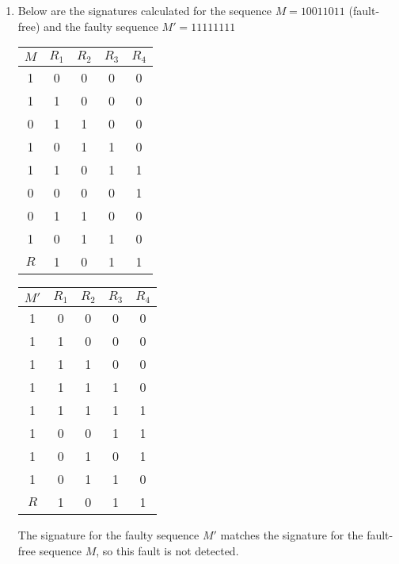 \documentclass[a4paper,12pt]{article}
\begin{document}
\begin{enumerate}
        \item Below are the signatures calculated for the sequence $M = {10011011}$ (fault-free) and the faulty sequence $M' = {11111111}$

            \begin{tabular}{|c|c|c|c|c|}
                \hline
                $M$ & $R_1$ & $R_2$ & $R_3$ & $R_4$ \\ \hline
                1   & 0     & 0     & 0     & 0     \\ \hline
                1   & 1     & 0     & 0     & 0     \\ \hline
                0   & 1     & 1     & 0     & 0     \\ \hline
                1   & 0     & 1     & 1     & 0     \\ \hline
                1   & 1     & 0     & 1     & 1     \\ \hline
                0   & 0     & 0     & 0     & 1     \\ \hline
                0   & 1     & 1     & 0     & 0     \\ \hline
                1   & 0     & 1     & 1     & 0     \\ \hline
                $R$ & 1     & 0     & 1     & 1     \\ \hline
            \end{tabular}
            \begin{tabular}{|c|c|c|c|c|}
                \hline
                $M'$ & $R_1$ & $R_2$ & $R_3$ & $R_4$ \\ \hline
                1    & 0     & 0     & 0     & 0     \\ \hline
                1    & 1     & 0     & 0     & 0     \\ \hline
                1    & 1     & 1     & 0     & 0     \\ \hline
                1    & 1     & 1     & 1     & 0     \\ \hline
                1    & 1     & 1     & 1     & 1     \\ \hline
                1    & 0     & 0     & 1     & 1     \\ \hline
                1    & 0     & 1     & 0     & 1     \\ \hline
                1    & 0     & 1     & 1     & 0     \\ \hline
                $R$  & 1     & 0     & 1     & 1     \\ \hline
            \end{tabular}

            The signature for the faulty sequence $M'$ matches the signature for the fault-free sequence $M$, so this fault is not detected.

    \end{enumerate}
\end{document}
